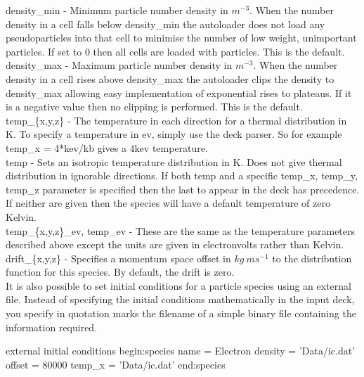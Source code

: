 {\emphtext density\_min} - Minimum particle number density in $m^{-3}$.
When the number density in a cell falls below density\_min the
autoloader does not load any pseudoparticles into that cell to minimise the
number of low weight, unimportant particles. If set to 0 then all cells are
loaded with particles. This is the default.\\

{\emphtext density\_max} - Maximum particle number density in $m^{-3}$.
When the number density in a cell rises above density\_max the
autoloader clips the density to density\_max allowing easy
implementation of exponential rises to plateaus. If it is a negative value
then no clipping is performed. This is the default.\\

{\emphtext temp\_\{x,y,z\}} - The temperature in each direction for a thermal
distribution in K. To specify a temperature in ev, simply use the deck
parser. So for example temp\_x = 4*kev/kb gives a 4kev temperature.\\

{\emphtext temp} - Sets an isotropic temperature distribution in K. Does not
give thermal distribution in ignorable directions. If both temp and a specific
temp\_x, temp\_y, temp\_z parameter is specified then the last to appear in the
deck has precedence. If neither are given then the species will have a default
temperature of zero Kelvin.\\

{\emphtext temp\_\{x,y,z\}\_ev, temp\_ev} - These are the same as the
temperature parameters described above except the units are given in
electronvolts rather than Kelvin.\\

{\emphtext drift\_\{x,y,z\}} - Specifies a momentum space offset in
$kg\ ms^{-1}$ to the distribution function for this species. By default,
the drift is zero.\\

It is also possible to set initial conditions for a particle species
using an external file.  Instead of specifying the
initial conditions mathematically in the input deck, you specify in quotation
marks the filename of a simple binary file containing the information required.

\begin{lboxverbatim}{external initial conditions}
begin:species
   name = Electron
   density = 'Data/ic.dat'
   offset = 80000
   temp_x = 'Data/ic.dat'
end:species
\end{lboxverbatim}


